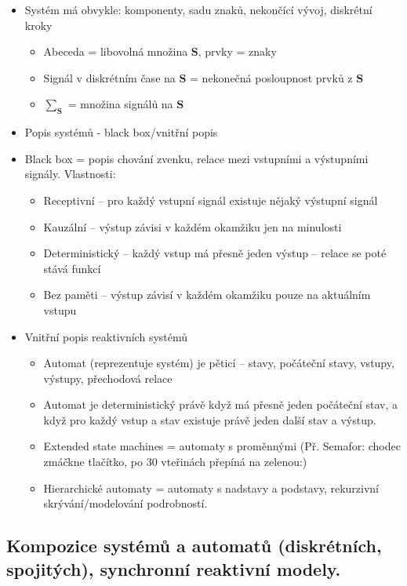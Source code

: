 \documentclass[a4paper,hidelinks]{article}
\begin{document}
\begin{itemize}
    \item Systém má obvykle: komponenty, sadu znaků, nekončící vývoj, diskrétní kroky
    \begin{itemize}
        \item Abeceda = libovolná množina $\mathbf{S}$, prvky = znaky
        \item Signál v diskrétním čase na $\mathbf{S}$ = nekonečná posloupnost prvků z $\mathbf{S}$
        \item $\sum_\mathbf{S}$ = množina signálů na $\mathbf{S}$    
    \end{itemize}
    \item Popis systémů - black box/vnitřní popis
    \item Black box = popis chování zvenku, relace mezi vstupními a výstupními signály. Vlastnosti:
    \begin{itemize}
        \item Receptivní -- pro každý vstupní signál existuje nějaký výstupní signál
        \item Kauzální -- výstup závisi v každém okamžiku jen na minulosti
        \item Deterministický -- každý vstup má přesně jeden výstup -- relace se poté stává funkcí
        \item Bez paměti -- výstup závisí v každém okamžiku pouze na aktuálním vstupu
    \end{itemize}
    \item Vnitřní popis reaktivních systémů
    \begin{itemize}
        \item Automat (reprezentuje systém) je pěticí -- stavy, počáteční stavy, vstupy, výstupy, přechodová relace
        \item Automat je deterministický právě když má přesně jeden počáteční stav, a když pro každý vstup a stav existuje právě jeden další stav a výstup.
        \item Extended state machines = automaty s proměnnými (Př. Semafor: chodec zmáčkne tlačítko, po 30 vteřinách přepíná na zelenou:)
        \item Hierarchické automaty = automaty s nadstavy a podstavy, rekurzivní skrývání/modelování podrobností.
    \end{itemize}
\end{itemize}

\subsection{Kompozice systémů a automatů (diskrétních, spojitých), synchronní reaktivní modely.}
\end{document}
